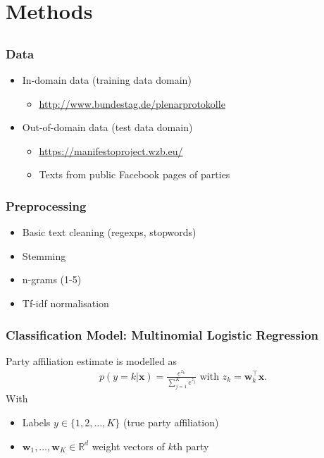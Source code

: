 \documentclass[]{beamer}
\newcommand{\R}{\ensuremath{\mathds{R}}}
\renewcommand{\vec}[1]{\mathbf{#1}}
\begin{document}
\section{Methods}
\subsection{}

\begin{frame}\frametitle{Data}
\begin{itemize}
\item In-domain data (training data domain)
\begin{itemize}
\item \url{http://www.bundestag.de/plenarprotokolle}
\end{itemize}
\vspace{1em}
\item Out-of-domain data (test data domain)
\begin{itemize}
\item \url{https://manifestoproject.wzb.eu/}
\item Texts from public Facebook pages of parties
\end{itemize}
\end{itemize}
\end{frame}

\begin{frame}\frametitle{Preprocessing}
\begin{itemize}
\item Basic text cleaning (regexps, stopwords)
\item Stemming
\item n-grams (1-5)
\item Tf-idf normalisation
\end{itemize}
\end{frame}

\begin{frame}\frametitle{Classification Model: Multinomial Logistic Regression}
Party affiliation estimate is modelled as
\begin{eqnarray}\label{eq:logreg_multiclass}
p(y=k|\vec{x}) = \frac{e^{z_k}}{\sum_{j=1}^K e^{z_j}}  \textrm{ with }  z_k=\vec{w}_k^{\top}\vec{x}.
\end{eqnarray}
With
\begin{itemize}
\item Labels $y\in\{1,2,\dots,K\}$ (true party affiliation)\\ 
\item $\vec{w}_1,\dots,\vec{w}_K\in\R^{d}$ weight vectors of $k$th party\\ 
\end{itemize}
\end{frame}
\end{document}
